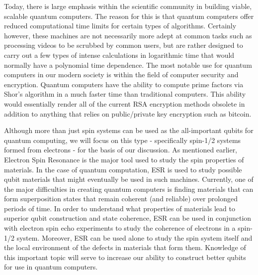 \documentclass[oneside, astronomy, noacknowlegments]{BYUPhys}
\begin{document}
Today, there is large emphasis within the scientific community in building viable, scalable quantum computers. The reason for this is that quantum computers offer reduced computational time limits for certain types of algorithms. Certainly however, these machines are not necessarily more adept at common tasks such as processing videos to be scrubbed by common users, but are rather designed to carry out a few types of intense calculations in logarithmic time that would normally have a polynomial time dependence. The most notable use for quantum computers in our modern society is within the field of computer security and encryption. Quantum computers have the ability to compute prime factors via Shor's algorithm in a much faster time than traditional computers. This ability would essentially render all of the current RSA encryption methods obsolete in addition to anything that relies on public/private key encryption such as bitcoin.

Although more than just spin systems can be used as the all-important qubits for quantum computing, we will focus on this type - specifically spin-1/2 systems formed from electrons - for the basis of our discussion. As mentioned earlier, Electron Spin Resonance is the major tool used to study the spin properties of materials. In the case of quantum computation, ESR is used to study possible qubit materials that might eventually be used in such machines. Currently, one of the major difficulties in creating quantum computers is finding materials that can form superposition states that remain coherent (and reliable) over prolonged periods of time. In order to understand what properties of materials lead to superior qubit construction and state coherence, ESR can be used in conjunction with electron spin echo experiments to study the coherence of electrons in a spin-1/2 system. Moreover, ESR can be used alone to study the spin system itself and the local environment of the defects in materials that form them. Knowledge of this important topic will serve to increase our ability to construct better qubits for use in quantum computers.
\end{document}
